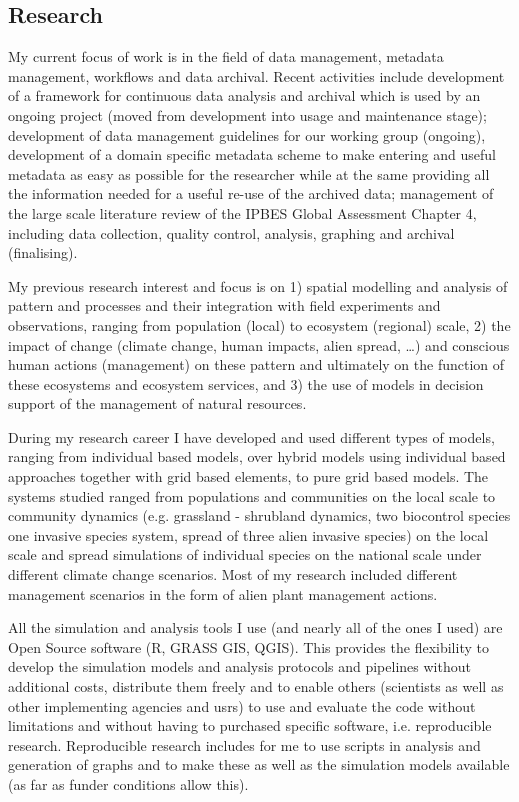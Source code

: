 \documentclass[a4paper]{article}
\begin{document}
\subsection{Research}


My current focus of work is in the field of data management, metadata
	management, workflows and data archival. Recent activities include
	development of a framework for continuous data analysis and archival
	which is used by an ongoing project (moved from development into usage
	and maintenance stage); development of data management guidelines for our
	working group (ongoing), development of a domain specific metadata scheme
	to make entering and useful metadata as easy as possible for the
	researcher while at the same providing all the information needed for a
	useful re-use of the archived data; management of the large scale
	literature review of the IPBES Global Assessment Chapter 4, including
	data collection, quality control, analysis, graphing and archival
	(finalising).

My previous research interest and focus is on 1) spatial modelling and
	analysis of pattern and processes and their integration with field
	experiments and observations, ranging from population (local) to
	ecosystem (regional) scale, 2) the impact of change (climate change,
	human impacts, alien spread, \ldots{}) and conscious human actions
	(management) on these pattern and ultimately on the function of these
	ecosystems and ecosystem services, and 3) the use of models in decision
	support of the management of natural resources.

During my research career I have developed and used different types of
	models, ranging from individual based models, over hybrid models using
	individual based approaches together with grid based elements, to pure
	grid based models. The systems studied ranged from populations and
	communities on the local scale to community dynamics (e.g. grassland -
	shrubland dynamics, two biocontrol species one invasive species system,
	spread of three alien invasive species) on the local scale and spread
	simulations of individual species on the national scale under different
	climate change scenarios. Most of my research included different
	management scenarios in the form of alien plant management actions.

All the simulation and analysis tools I use (and nearly all of the ones I
	used) are Open Source software (R, GRASS GIS, QGIS). This provides the
	flexibility to develop the simulation models and analysis protocols and
	pipelines without additional costs, distribute them freely and to enable
	others (scientists as well as other implementing agencies and usrs) to
	use and evaluate the code without limitations and without having to
	purchased specific software, i.e. reproducible research. Reproducible
	research includes for me to use scripts in analysis and generation of
	graphs and to make these as well as the simulation models available (as
	far as funder conditions allow this).
\end{document}

